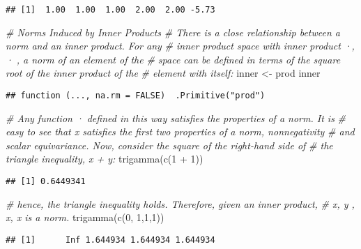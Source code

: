 \documentclass[
]{article}
\newenvironment{Shaded}{\begin{snugshade}}{\end{snugshade}}
\newcommand{\CommentTok}[1]{\textcolor[rgb]{0.56,0.35,0.01}{\textit{#1}}}
\newcommand{\DecValTok}[1]{\textcolor[rgb]{0.00,0.00,0.81}{#1}}
\newcommand{\FunctionTok}[1]{\textcolor[rgb]{0.00,0.00,0.00}{#1}}
\newcommand{\NormalTok}[1]{#1}
\newcommand{\OtherTok}[1]{\textcolor[rgb]{0.56,0.35,0.01}{#1}}
\newcommand{\SpecialCharTok}[1]{\textcolor[rgb]{0.00,0.00,0.00}{#1}}
\begin{document}
\begin{verbatim}
## [1]  1.00  1.00  1.00  2.00  2.00 -5.73
\end{verbatim}

\begin{Shaded}
\begin{Highlighting}[]
\CommentTok{\# Norms Induced by Inner Products}
\CommentTok{\# There is a close relationship between a norm and an inner product. For any}
\CommentTok{\# inner product space with inner product ·, · , a norm of an element of the}
\CommentTok{\# space can be deﬁned in terms of the square root of the inner product of the}
\CommentTok{\# element with itself:}
\NormalTok{inner }\OtherTok{\textless{}{-}}\NormalTok{ prod}
\NormalTok{inner}
\end{Highlighting}
\end{Shaded}

\begin{verbatim}
## function (..., na.rm = FALSE)  .Primitive("prod")
\end{verbatim}

\begin{Shaded}
\begin{Highlighting}[]
\CommentTok{\# Any function · deﬁned in this way satisﬁes the properties of a norm. It is}
\CommentTok{\# easy to see that x satisﬁes the ﬁrst two properties of a norm, nonnegativity}
\CommentTok{\# and scalar equivariance. Now, consider the square of the right{-}hand side of}
\CommentTok{\# the triangle inequality, x + y:}
\FunctionTok{trigamma}\NormalTok{(}\FunctionTok{c}\NormalTok{(}\DecValTok{1} \SpecialCharTok{+} \DecValTok{1}\NormalTok{))}
\end{Highlighting}
\end{Shaded}

\begin{verbatim}
## [1] 0.6449341
\end{verbatim}

\begin{Shaded}
\begin{Highlighting}[]
\CommentTok{\# hence, the triangle inequality holds. Therefore, given an inner product, }
\CommentTok{\# x, y , x, x is a norm.}
\FunctionTok{trigamma}\NormalTok{(}\FunctionTok{c}\NormalTok{(}\DecValTok{0}\NormalTok{, }\DecValTok{1}\NormalTok{,}\DecValTok{1}\NormalTok{,}\DecValTok{1}\NormalTok{))}
\end{Highlighting}
\end{Shaded}

\begin{verbatim}
## [1]      Inf 1.644934 1.644934 1.644934
\end{verbatim}
\end{document}
